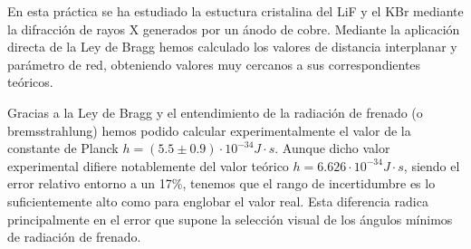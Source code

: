 En esta práctica se ha estudiado la estuctura cristalina del LiF y el KBr mediante la difracción de rayos X generados por un ánodo de cobre. Mediante la aplicación directa de la Ley de Bragg hemos calculado los valores de distancia interplanar y parámetro de red, obteniendo valores muy cercanos a sus correspondientes teóricos.

Gracias a la Ley de Bragg y el entendimiento de la radiación de frenado (o bremsstrahlung) hemos podido calcular experimentalmente el valor de la constante de Planck $h = (5.5 \pm 0.9)\cdot 10^{-34} J \cdot s$. Aunque dicho valor experimental difiere notablemente del valor teórico $h = 6.626 \cdot 10^{-34} J \cdot s$, siendo el error relativo entorno a un 17\%, tenemos que el rango de incertidumbre es lo suficientemente alto como para englobar el valor real. Esta diferencia radica principalmente en el error que supone la selección visual de los ángulos mínimos de radiación de frenado.